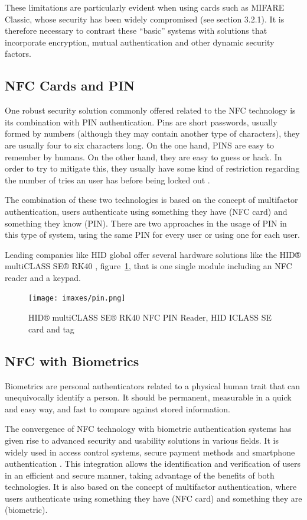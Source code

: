 These limitations are particularly evident when using cards such as MIFARE Classic, whose security has been widely compromised \cite{ref70} (see section 3.2.1). It is therefore necessary to contrast these ``basic'' systems with solutions that incorporate encryption, mutual authentication and other dynamic security factors.

\subsection{NFC Cards and PIN}

One robust security solution commonly offered related to the NFC technology is its combination with PIN authentication. Pins are short passwords, usually formed by numbers (although they may contain another type of characters), they are usually four to six characters long. On the one hand, PINS are easy to remember by humans. On the other hand, they are easy to guess or hack. In order to try to mitigate this, they usually have some kind of restriction regarding the number of tries an user has before being locked out \cite{ref30}.

The combination of these two technologies is based on the concept of multifactor authentication, users authenticate using something they have (NFC card) and something they know (PIN). There are two approaches in the usage of PIN in this type of system, using the same PIN for every user or using one for each user.

Leading companies like HID global offer several hardware solutions like the HID® multiCLASS SE® RK40 \cite{ref75}, figure~\ref{fig:hid_multiclass}, that is one single module including an NFC reader and a keypad.

\begin{figure}[h!]
	\centering
	\texttt{[image: imaxes/pin.png]} 
	\caption{HID® multiCLASS SE® RK40 NFC PIN Reader, HID ICLASS SE card and tag}
	\label{fig:hid_multiclass}
\end{figure}

\subsection{NFC with Biometrics}

Biometrics are personal authenticators related to a physical human trait that can unequivocally identify a person. It should be permanent, measurable in a quick and easy way, and fast to compare against stored information.

The convergence of NFC technology with biometric authentication systems has given rise to advanced security and usability solutions in various fields. It is widely used in access control systems, secure payment methods and smartphone authentication \cite{ref83}. This integration allows the identification and verification of users in an efficient and secure manner, taking advantage of the benefits of both technologies. It is also based on the concept of multifactor authentication, where users authenticate using something they have (NFC card) and something they are (biometric).

